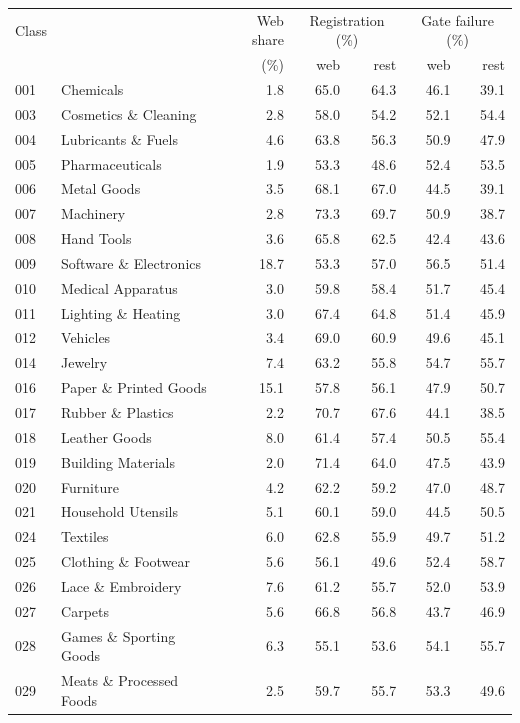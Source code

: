 \begin{tabular}{llrrrrr}
\toprule
Class & & Web share & \multicolumn{2}{c}{Registration (\%)} & \multicolumn{2}{c}{Gate failure (\%)} \\
 & & (\%) & web & rest & web & rest \\
\midrule
001 & Chemicals & 1.8 & 65.0 & 64.3 & 46.1 & 39.1 \\
003 & Cosmetics \& Cleaning & 2.8 & 58.0 & 54.2 & 52.1 & 54.4 \\
004 & Lubricants \& Fuels & 4.6 & 63.8 & 56.3 & 50.9 & 47.9 \\
005 & Pharmaceuticals & 1.9 & 53.3 & 48.6 & 52.4 & 53.5 \\
006 & Metal Goods & 3.5 & 68.1 & 67.0 & 44.5 & 39.1 \\
007 & Machinery & 2.8 & 73.3 & 69.7 & 50.9 & 38.7 \\
008 & Hand Tools & 3.6 & 65.8 & 62.5 & 42.4 & 43.6 \\
009 & Software \& Electronics & 18.7 & 53.3 & 57.0 & 56.5 & 51.4 \\
010 & Medical Apparatus & 3.0 & 59.8 & 58.4 & 51.7 & 45.4 \\
011 & Lighting \& Heating & 3.0 & 67.4 & 64.8 & 51.4 & 45.9 \\
012 & Vehicles & 3.4 & 69.0 & 60.9 & 49.6 & 45.1 \\
014 & Jewelry & 7.4 & 63.2 & 55.8 & 54.7 & 55.7 \\
016 & Paper \& Printed Goods & 15.1 & 57.8 & 56.1 & 47.9 & 50.7 \\
017 & Rubber \& Plastics & 2.2 & 70.7 & 67.6 & 44.1 & 38.5 \\
018 & Leather Goods & 8.0 & 61.4 & 57.4 & 50.5 & 55.4 \\
019 & Building Materials & 2.0 & 71.4 & 64.0 & 47.5 & 43.9 \\
020 & Furniture & 4.2 & 62.2 & 59.2 & 47.0 & 48.7 \\
021 & Household Utensils & 5.1 & 60.1 & 59.0 & 44.5 & 50.5 \\
024 & Textiles & 6.0 & 62.8 & 55.9 & 49.7 & 51.2 \\
025 & Clothing \& Footwear & 5.6 & 56.1 & 49.6 & 52.4 & 58.7 \\
026 & Lace \& Embroidery & 7.6 & 61.2 & 55.7 & 52.0 & 53.9 \\
027 & Carpets & 5.6 & 66.8 & 56.8 & 43.7 & 46.9 \\
028 & Games \& Sporting Goods & 6.3 & 55.1 & 53.6 & 54.1 & 55.7 \\
029 & Meats \& Processed Foods & 2.5 & 59.7 & 55.7 & 53.3 & 49.6 \\

\end{tabular}
